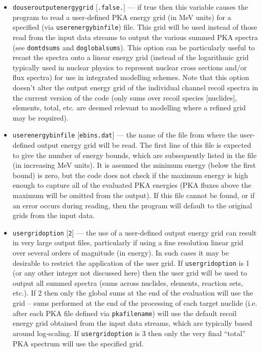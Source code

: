 \documentclass[a4paper]{article}
\begin{document}
\begin{itemize}

\item \texttt{do{\textunderscore}user{\textunderscore}output{\textunderscore}energy{\textunderscore}grid} [\texttt{.false.}] --- if true then this variable causes the program to read a user-defined PKA energy grid (in MeV units) for a specified (via \texttt{user{\textunderscore}energybin{\textunderscore}file}) file. This grid will be used instead of those read from the input data streams to output the various summed PKA spectra (see \texttt{do{\textunderscore}mtd{\textunderscore}sums} and \texttt{do{\textunderscore}global{\textunderscore}sums}). This option can be particularly useful to recast the spectra onto a linear energy grid (instead of the logarithmic grid typically used in nuclear physics to represent nuclear cross sections and/or flux spectra) for use in integrated modelling schemes. Note that this option doesn't alter the output energy grid of the individual channel recoil spectra in the current version of the code (only sums over recoil species [nuclides], elements, total, etc. are deemed relevant to modelling where a refined grid may be required).

\item \texttt{user{\textunderscore}energybin{\textunderscore}file} [\texttt{ebins.dat}] --- the name of the file from where the user-defined output energy grid will be read. The first line of this file is expected to give the number of energy bounds, which are subsequently listed in the file (in increasing MeV units). It is assumed the minimum energy (below the first bound) is zero, but the code does not check if the maximum energy is high enough to capture all of the evaluated PKA energies (PKA fluxes above the maximum will be omitted from the output). If this file cannot be found, or if an error occurs during reading, then the program will default to the original grids from the input data.

\item \texttt{user{\textunderscore}grid{\textunderscore}option} [\texttt{2}] --- the use of a user-defined output energy grid can result in very large output files, particularly if using a fine resolution linear grid over several orders of magnitude (in energy). In such cases it may be desirable to restrict the application of the user grid. If \texttt{user{\textunderscore}grid{\textunderscore}option} is 1 (or any other integer not discussed here) then the user grid will be used to output all summed spectra (sums across nuclides, elements, reaction sets, etc.). If 2 then only the global sums at the end of the evaluation will use the grid -- sums performed at the end of the processing of each target nuclide (i.e. after each PKA file defined via \texttt{pka{\textunderscore}filename}) will use the default recoil energy grid obtained from the input data streams, which are typically based around log-scaling. If \texttt{user{\textunderscore}grid{\textunderscore}option} is 3 then only the very final ``total'' PKA spectrum will use the specified grid.


\end{itemize}
\end{document}
